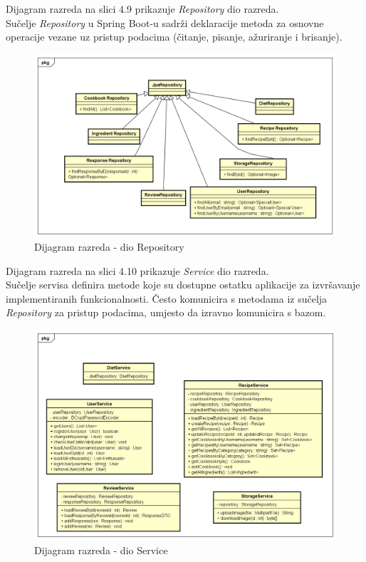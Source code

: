 Dijagram razreda na slici 4.9 prikazuje \textit{Repository} dio razreda. \\
Sučelje \textit{Repository} u Spring Boot-u sadrži deklaracije metoda za osnovne operacije vezane uz pristup podacima (čitanje, pisanje, ažuriranje i brisanje).


			\begin{figure}[H]
			\includegraphics[scale=0.2]{dijagrami/UML_dijagram_razreda_repositories.png} %
			\centering
			\caption{Dijagram razreda - dio Repository}
			\label{Dijagram razreda - dio Repository}
		\end{figure} 

Dijagram razreda na slici 4.10 prikazuje \textit{Service} dio razreda. \\
Sučelje servisa definira metode koje su dostupne ostatku aplikacije za izvršavanje implementiranih funkcionalnosti. Često komunicira s metodama iz sučelja \textit{Repository} za pristup podacima, umjesto da izravno komunicira s bazom.


			\begin{figure}[H]
			\includegraphics[scale=0.2]{dijagrami/UML_dijagram_razreda_services.png} %
			\centering
			\caption{Dijagram razreda - dio Service}
			\label{Dijagram razreda - dio Service}
		\end{figure} 



